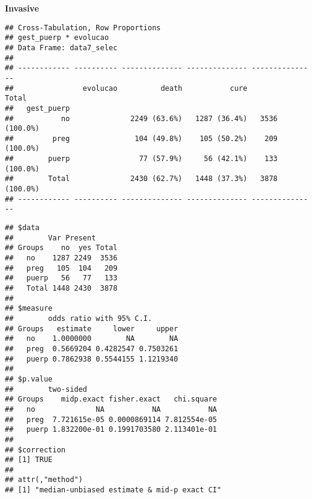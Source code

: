 \documentclass[
]{article}
\newenvironment{Shaded}{\begin{snugshade}}{\end{snugshade}}
\newcommand{\DataTypeTok}[1]{\textcolor[rgb]{0.13,0.29,0.53}{#1}}
\newcommand{\KeywordTok}[1]{\textcolor[rgb]{0.13,0.29,0.53}{\textbf{#1}}}
\newcommand{\NormalTok}[1]{#1}
\newcommand{\OperatorTok}[1]{\textcolor[rgb]{0.81,0.36,0.00}{\textbf{#1}}}
\newcommand{\OtherTok}[1]{\textcolor[rgb]{0.56,0.35,0.01}{#1}}
\newcommand{\StringTok}[1]{\textcolor[rgb]{0.31,0.60,0.02}{#1}}
\begin{document}
\textbf{Invasive}

\begin{Shaded}
\end{Shaded}

\begin{Shaded}
\end{Shaded}

\begin{verbatim}
## Cross-Tabulation, Row Proportions  
## gest_puerp * evolucao  
## Data Frame: data7_selec  
## 
## ------------ ---------- -------------- -------------- ---------------
##                evolucao          death           cure           Total
##   gest_puerp                                                         
##           no              2249 (63.6%)   1287 (36.4%)   3536 (100.0%)
##         preg               104 (49.8%)    105 (50.2%)    209 (100.0%)
##        puerp                77 (57.9%)     56 (42.1%)    133 (100.0%)
##        Total              2430 (62.7%)   1448 (37.3%)   3878 (100.0%)
## ------------ ---------- -------------- -------------- ---------------
\end{verbatim}

\begin{Shaded}
\end{Shaded}

\begin{verbatim}
## $data
##        Var Present
## Groups    no  yes Total
##   no    1287 2249  3536
##   preg   105  104   209
##   puerp   56   77   133
##   Total 1448 2430  3878
## 
## $measure
##        odds ratio with 95% C.I.
## Groups   estimate     lower     upper
##   no    1.0000000        NA        NA
##   preg  0.5669204 0.4282547 0.7503261
##   puerp 0.7862938 0.5544155 1.1219340
## 
## $p.value
##        two-sided
## Groups    midp.exact fisher.exact   chi.square
##   no              NA           NA           NA
##   preg  7.721615e-05 0.0000869114 7.812554e-05
##   puerp 1.832200e-01 0.1991703580 2.113401e-01
## 
## $correction
## [1] TRUE
## 
## attr(,"method")
## [1] "median-unbiased estimate & mid-p exact CI"
\end{verbatim}
\end{document}
